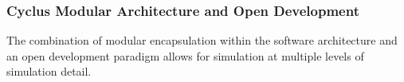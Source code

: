 
\begin{frame}
  \frametitle{Cyclus Modular Architecture and Open Development}
  The combination of modular encapsulation within the software
  architecture and an open development paradigm allows for simulation
  at multiple levels of simulation detail.
\end{frame}





